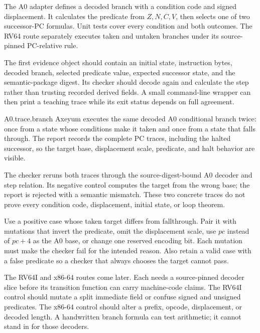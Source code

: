 The A0 adapter defines a decoded branch with a condition code and signed
displacement. It calculates the predicate from \(Z,N,C,V\), then selects one
of two successor-PC formulas. Unit tests cover every condition and both
outcomes. The RV64 route separately executes taken and untaken branches under
its source-pinned PC-relative rule.

The first evidence object should contain an initial state, instruction bytes,
decoded branch, selected predicate value, expected successor state, and the
semantic-package digest. Its checker should decode again and calculate the
step rather than trusting recorded derived fields. A small command-line
wrapper can then print a teaching trace while its exit status depends on full
agreement.

\begin{artifact}{A0.trace.branch}
Axeyum executes the same decoded A0 conditional branch twice: once from a
state whose conditions make it taken and once from a state that falls through.
The report records the complete PC traces, including the halted successor, so
the target base, displacement scale, predicate, and halt behavior are visible.

The checker reruns both traces through the source-digest-bound A0 decoder and
step relation. Its negative control computes the target from the wrong base;
the report is rejected with a semantic mismatch. These two concrete traces do
not prove every condition code, displacement, initial state, or loop theorem.
\end{artifact}

\begin{example}[title={Controls for the first branch checker}]
Use a positive case whose taken target differs from fallthrough. Pair it with
mutations that invert the predicate, omit the displacement scale, use \(pc\)
instead of \(pc+4\) as the A0 base, or change one reserved encoding bit. Each
mutation must make the checker fail for the intended reason. Also retain a
valid case with a false predicate so a checker that always chooses the target
cannot pass.
\end{example}

The RV64I and x86-64 routes come later. Each needs a source-pinned decoder
slice before its transition function can carry machine-code claims. The RV64I
control should mutate a split immediate field or confuse signed and unsigned
predicates. The x86-64 control should alter a prefix, opcode, displacement, or
decoded length. A handwritten branch formula can test arithmetic; it cannot
stand in for those decoders.

